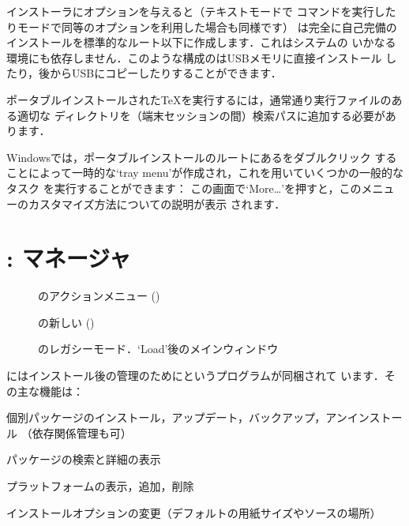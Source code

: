 \documentclass[uplatex,dvipdfmx]{jsarticle}
\begin{document}
\TL インストーラにオプションを与えると（テキストモードで%
コマンドを実行したり\GUI モードで同等のオプションを利用した場合も同様です）\TL
は完全に自己完備のインストールを標準的なルート以下に作成します．これはシステムの
いかなる環境にも依存しません．このような構成の\TL はUSBメモリに直接インストール
したり，後からUSBにコピーしたりすることができます．

ポータブルインストールされた\TeX を実行するには，通常通り実行ファイルのある適切な
ディレクトリを（端末セッションの間）検索パスに追加する必要があります．

Windowsでは，ポータブルインストールのルートにあるをダブルクリック
することによって一時的な`tray menu'が作成され，これを用いていくつかの一般的なタスク
を実行することができます：
%
\medskip
{}
\smallskip
%
この画面で`More\ldots'を押すと，このメニューのカスタマイズ方法についての説明が表示
されます．

\section{: \TL マネージャ}
\label{sec:tlmgr}

\begin{figure}[tb]
\caption{ \GUI のアクションメニュー (\macOS)}
\label{fig:tlshell}
\end{figure}

\begin{figure}[tb]
\caption{の新しい{\GUI} ()}
\label{fig:tlcockpit}
\end{figure}

\begin{figure}[tb]
\caption{のレガシー\GUI モード．`Load'後のメインウィンドウ}
\label{fig:tlmgr-gui}
\end{figure}

\TL にはインストール後の\TL 管理のためにというプログラムが同梱されて
います．その主な機能は：
%
\begin{itemize*}
\item 個別パッケージのインストール，アップデート，バックアップ，アンインストール
  （依存関係管理も可）
\item パッケージの検索と詳細の表示
\item プラットフォームの表示，追加，削除
\item インストールオプションの変更（デフォルトの用紙サイズやソースの場所）
\end{itemize*}
\end{document}
